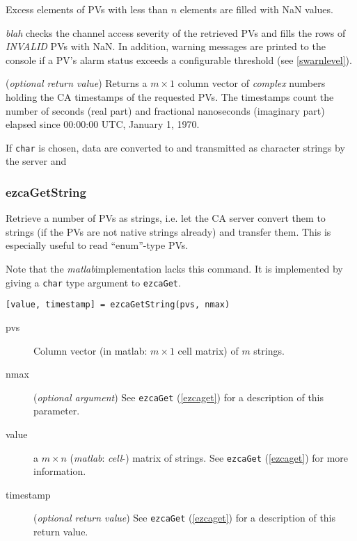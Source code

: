 \documentclass{article}
\newcommand{\sca}{{\em blah}}
\newcommand{\matlab}{{\em matlab}}
\newcommand{\com}[1]{{\tt #1}}
\newcommand{\NAN}{\mbox{NaN}}
\newcommand{\PVITEM}{
\item[pvs] Column vector (in matlab: $m\times 1$ cell matrix)
of $m$ strings.
}
\begin{document}
\begin{description}
Excess elements of PVs with less than $n$ elements are filled with
\NAN{} values.

\sca{} checks the channel access severity of the retrieved PVs and
fills the rows of {\em INVALID} PVs with \NAN. In addition, warning
messages are printed to the console if a PV's alarm status exceeds
a configurable threshold (see \ref{swarnlevel}).
%
%
\item[timestamp] ({\em optional return value}) Returns a $m\times 1$
column vector of {\em complex} numbers holding the CA timestamps of
the requested PVs. The timestamps count the number of seconds (real part)
and fractional nanoseconds (imaginary part) elapsed since
00:00:00 UTC, January 1, 1970.
\end{description}

If \com{char}{} is chosen, data are converted to and transmitted
as character strings by the server and 

\subsubsection{ezcaGetString}
\label{getstring}
Retrieve a number of PVs as strings, i.e. let the CA server convert
them to strings (if the PVs are not native strings already) and transfer
them. This is especially useful to read ``enum''-type PVs.

Note that the \matlab implementation lacks this command. It is implemented
by giving a \com{char}{} type argument to \com{ezcaGet}.
\begin{verbatim}
[value, timestamp] = ezcaGetString(pvs, nmax)
\end{verbatim}
\begin{description}
\PVITEM
%
%
\item[nmax] ({\em optional argument})
See \com{ezcaGet}{} (\ref{ezcaget}) for a description of this parameter.
\item[value] a $m\times n$ (\matlab: {\em cell}-) matrix of strings. See \com{ezcaGet}{}
(\ref{ezcaget}) for more information.
\item[timestamp] ({\em optional return value})
See \com{ezcaGet}{} (\ref{ezcaget}) for a description of this return value.
\end{description}
\end{document}
